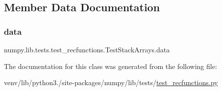 \subsection{Member Data Documentation}
\mbox{\label{classnumpy_1_1lib_1_1tests_1_1test__recfunctions_1_1TestStackArrays_a3d7dcd953cb9d7b4a6bc8a5166ff8d5a}} 
\subsubsection{\texorpdfstring{data}{data}}
{\footnotesize\ttfamily numpy.\+lib.\+tests.\+test\+\_\+recfunctions.\+Test\+Stack\+Arrays.\+data}



The documentation for this class was generated from the following file\+:\begin{DoxyCompactItemize}
\item 
venv/lib/python3./site-\/packages/numpy/lib/tests/\hyperlink{test__recfunctions_8py}{test\+\_\+recfunctions.\+py}\end{DoxyCompactItemize}
